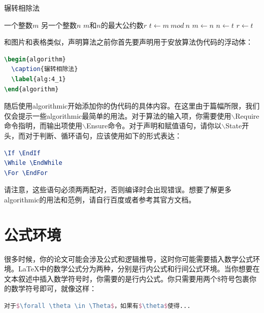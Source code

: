 \begin{algorithm}
\caption{辗转相除法}
\label{alg:4_1}
\begin{algorithmic}
\Require 一个整数$m$
\Require 另一个整数$n$
\Ensure $m$和$n$的最大公约数$r$
    \State $t \leftarrow m ~ mod ~ n$
    \State $m \leftarrow n$
    \State $n \leftarrow t$
\EndWhile
\State $r \leftarrow t$
\end{algorithmic}
\end{algorithm}

和图片和表格类似，声明算法之前你首先要声明用于安放算法伪代码的浮动体：

\begin{tcolorbox}
\begin{lstlisting}[language=TeX]
\begin{algorithm}
  \caption{辗转相除法}
  \label{alg:4_1}
\end{algorithm}
\end{lstlisting}
\end{tcolorbox}

\noindent 随后使用{\codefont algorithmic}开始添加你的伪代码的具体内容。在这里由于篇幅所限，我们仅会提示一些{\codefont algorithmic}最简单的用法。对于算法的输入项，你需要使用{\codefont $\backslash$Require}命令指明，而输出项使用{\codefont $\backslash$Ensure}命令。对于声明和赋值语句，请你以{\codefont $\backslash$State}开头，而对于判断、循环语句，应该使用如下的形式表达：

\begin{tcolorbox}
\begin{lstlisting}[language=TeX]
\If \EndIf
\While \EndWhile
\For \EndFor
\end{lstlisting}
\end{tcolorbox}

\noindent 请注意，这些语句必须两两配对，否则编译时会出现错误。想要了解更多{\codefont algorithmic}的用法和范例，请自行百度或者参考其官方文档。

\section{公式环境}

很多时候，你的论文可能会涉及公式和逻辑推导，这时你可能需要插入数学公式环境。\LaTeX 中的数学公式分为两种，分别是行内公式和行间公式环境。当你想要在文本叙述中插入数学符号时，你需要的是行内公式。你只需要用两个\$符号包裹你的数学符号即可，就像这样：

\begin{tcolorbox}
\begin{lstlisting}[language=TeX]
对于$\forall \theta \in \Theta$，如果有$\theta$使得...
\end{lstlisting}
\end{tcolorbox}

